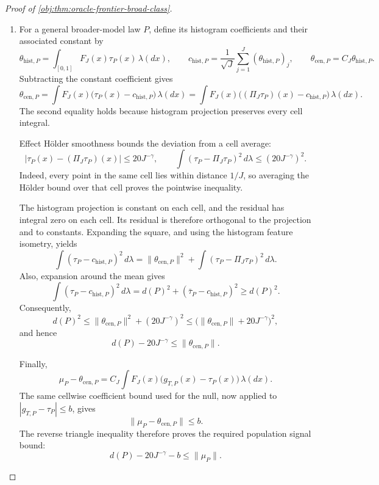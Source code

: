 \begin{proof}[Proof of \cref{obj:thm:oracle-frontier-broad-class}]
\begin{enumerate}
\item For a general broader-model law \(P\), define its histogram coefficients and their associated constant by
\[
\theta_{\mathrm{hist},P}
=\int_{[0,1]}F_J(x)\tau_P(x)\,\lambda(dx),
\qquad
c_{\mathrm{hist},P}
=\frac1{\sqrt J}\sum_{j=1}^J(\theta_{\mathrm{hist},P})_j,
\qquad
\theta_{\mathrm{cen},P}=C_J\theta_{\mathrm{hist},P}.
\]
Subtracting the constant coefficient gives
\[
\theta_{\mathrm{cen},P}
=\int F_J(x)\bigl(\tau_P(x)-c_{\mathrm{hist},P}\bigr)\,\lambda(dx)
=\int F_J(x)\bigl((\Pi_J\tau_P)(x)-c_{\mathrm{hist},P}\bigr)\,\lambda(dx).
\]
The second equality holds because histogram projection preserves every cell integral.

Effect Hölder smoothness bounds the deviation from a cell average:
\[
|\tau_P(x)-(\Pi_J\tau_P)(x)|
\le20J^{-\gamma},
\qquad
\int(\tau_P-\Pi_J\tau_P)^2\,d\lambda
\le(20J^{-\gamma})^2.
\]
Indeed, every point in the same cell lies within distance \(1/J\), so averaging the Hölder bound over that cell proves the pointwise inequality.

The histogram projection is constant on each cell, and the residual has integral zero on each cell. Its residual is therefore orthogonal to the projection and to constants. Expanding the square, and using the histogram feature isometry, yields
\[
\int(\tau_P-c_{\mathrm{hist},P})^2\,d\lambda
=
\|\theta_{\mathrm{cen},P}\|^2
+\int(\tau_P-\Pi_J\tau_P)^2\,d\lambda.
\]
Also, expansion around the mean gives
\[
\int(\tau_P-c_{\mathrm{hist},P})^2\,d\lambda
=d(P)^2+(\bar\tau_P-c_{\mathrm{hist},P})^2
\ge d(P)^2.
\]
Consequently,
\[
d(P)^2
\le\|\theta_{\mathrm{cen},P}\|^2+(20J^{-\gamma})^2
\le\bigl(\|\theta_{\mathrm{cen},P}\|+20J^{-\gamma}\bigr)^2,
\]
and hence
\[
d(P)-20J^{-\gamma}\le\|\theta_{\mathrm{cen},P}\|.
\]

Finally,
\[
\mu_P-\theta_{\mathrm{cen},P}
=C_J\int F_J(x)\bigl(g_{T,P}(x)-\tau_P(x)\bigr)\,\lambda(dx).
\]
The same cellwise coefficient bound used for the null, now applied to
\(|g_{T,P}-\tau_P|\le b\), gives
\[
\|\mu_P-\theta_{\mathrm{cen},P}\|\le b.
\]
The reverse triangle inequality therefore proves the required population signal bound:
\[
d(P)-20J^{-\gamma}-b\le\|\mu_P\|.
\]


\end{enumerate}
\end{proof}
